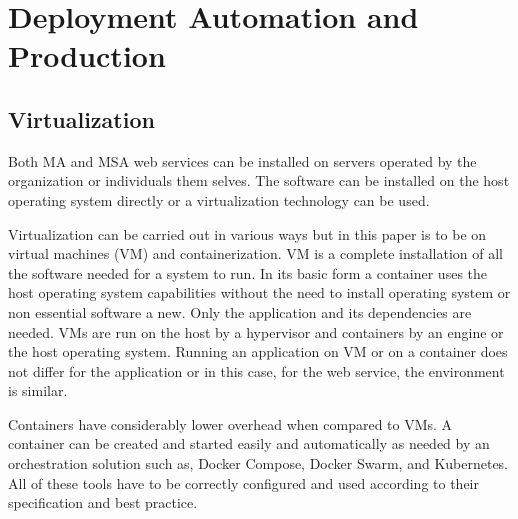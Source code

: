 

\section{Deployment Automation and Production}
\subsection{Virtualization}
\begin{sloppypar}
    Both MA and MSA web services can be installed on servers operated by the
    organization or individuals them selves. The software can be installed on
    the host operating system directly or a virtualization technology can be
    used.
\end{sloppypar}
\begin{sloppypar}
    Virtualization can be carried out in various ways but in this paper is to be
    on virtual machines (VM) and containerization. VM is a complete installation
    of all the software needed for a system to run. In its basic form a
    container uses the host operating system capabilities without the need to
    install operating system or non essential software a new. Only the
    application and its dependencies are needed. VMs are run on the host by a
    hypervisor and containers by an engine or the host operating system. Running
    an application on VM or on a container does not differ for the application
    or in this case, for the web service, the environment is similar.
\end{sloppypar}
\begin{sloppypar}
    Containers have considerably lower overhead when compared to VMs. A
    container can be created and started easily and automatically as needed by
    an orchestration solution such as, Docker Compose, Docker Swarm, and
    Kubernetes. All of these tools have to be correctly configured and used
    according to their specification and best practice.
\end{sloppypar}

